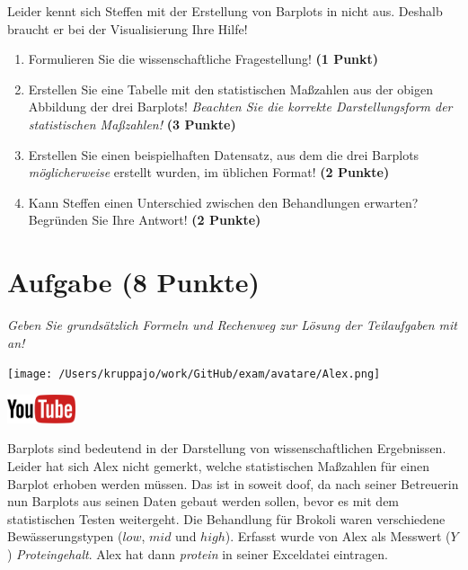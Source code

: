 \documentclass[a4paper, 9pt]{scrartcl}\usepackage[]{graphicx}\usepackage[]{xcolor}
\begin{document}
Leider kennt sich Steffen mit der Erstellung von Barplots in \Rlogo nicht aus. Deshalb braucht er bei der Visualisierung Ihre Hilfe!

\begin{enumerate}
\item Formulieren Sie die wissenschaftliche Fragestellung! \textbf{(1 Punkt)}
\item Erstellen Sie eine Tabelle mit den statistischen Maßzahlen aus der obigen Abbildung der drei Barplots! \textit{Beachten Sie die korrekte Darstellungsform der statistischen Maßzahlen!} \textbf{(3 Punkte)}
\item Erstellen Sie einen beispielhaften Datensatz, aus dem die drei Barplots \textit{möglicherweise} erstellt wurden, im \Rlogo üblichen Format! \textbf{(2 Punkte)}
\item Kann Steffen einen Unterschied zwischen den Behandlungen erwarten? Begründen Sie Ihre Antwort! \textbf{(2 Punkte)}
\end{enumerate} 
\clearpage

\section{Aufgabe \hfill (8 Punkte)}

\textit{Geben Sie grundsätzlich Formeln und Rechenweg zur Lösung der Teilaufgaben mit an!} \\[1Ex]
 

 
\begin{minipage}[t]{0.5\textwidth}
\texttt{[image: /Users/kruppajo/work/GitHub/exam/avatare/Alex.png]}
\end{minipage}
\begin{minipage}[t]{0.5\textwidth}
\hfill
\href{https://youtu.be/vXnLttRL_VI}{\includegraphics[width = 2cm]{img/youtube}}\\[1Ex]
\end{minipage}
\vspace{1ex}



Barplots sind bedeutend in der Darstellung von wissenschaftlichen Ergebnissen. Leider hat sich Alex nicht gemerkt, welche statistischen Maßzahlen für einen Barplot erhoben werden müssen. Das ist in soweit doof, da nach seiner Betreuerin nun Barplots aus seinen Daten gebaut werden sollen, bevor es mit dem statistischen Testen weitergeht. Die Behandlung für Brokoli waren verschiedene Bewässerungstypen ($low$, $mid$ und $high$). Erfasst wurde von Alex als Messwert ($Y$) \textit{Proteingehalt}. Alex hat dann \textit{protein} in seiner Exceldatei eintragen.
\end{document}

